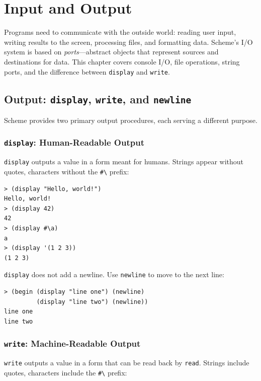 \chapter{Input and Output}
\label{ch:io}

Programs need to communicate with the outside world: reading user input, writing results to the screen, processing files, and formatting data. Scheme's I/O system is based on \emph{ports}---abstract objects that represent sources and destinations for data. This chapter covers console I/O, file operations, string ports, and the difference between \texttt{display} and \texttt{write}.

\section{Output: \texttt{display}, \texttt{write}, and \texttt{newline}}

Scheme provides two primary output procedures, each serving a different purpose.

\subsection{\texttt{display}: Human-Readable Output}

\texttt{display} outputs a value in a form meant for humans. Strings appear without quotes, characters without the \texttt{\#\textbackslash} prefix:

\begin{lstlisting}[style=repl]
> (display "Hello, world!")
Hello, world!
> (display 42)
42
> (display #\a)
a
> (display '(1 2 3))
(1 2 3)
\end{lstlisting}

\texttt{display} does not add a newline. Use \texttt{newline} to move to the next line:

\begin{lstlisting}[style=repl]
> (begin (display "line one") (newline)
         (display "line two") (newline))
line one
line two
\end{lstlisting}

\subsection{\texttt{write}: Machine-Readable Output}

\texttt{write} outputs a value in a form that can be read back by \texttt{read}. Strings include quotes, characters include the \texttt{\#\textbackslash} prefix:

